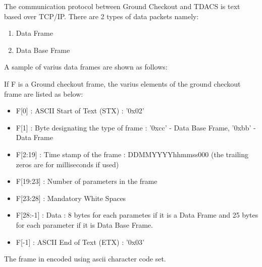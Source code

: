 \par The communication protocol between Ground Checkout and TDACS is text based
over TCP/IP. There are 2 types of data packets namely:
\begin{enumerate}
	\item Data Frame
	\item Data Base Frame
\end{enumerate}
A sample of varius data frames are shown as follows:


If F is a Ground checkout frame, the varius elements of the ground checkout
frame are listed as below:


\begin{itemize}
	\item F[0] : ASCII Start of Text (STX) : '0x02'
	\item F[1] : Byte designating the type of frame : '0xcc' - Data Base Frame,
		'0xbb' - Data Frame
	\item F[2:19] : Time stamp of the frame :  DDMMYYYYhhmmss000 (the trailing
		zeros are for milliseconds if used)
	\item F[19:23] : Number of parameters in the frame
	\item F[23:28] : Mandatory White Spaces
	\item F[28:-1] : Data : 8 bytes for each parametes if it is a Data Frame
		and 25 bytes for each parameter if it is Data Base Frame.
	\item F[-1] : ASCII End of Text (ETX) : '0x03'
\end{itemize}
The frame in encoded using ascii character code set.


